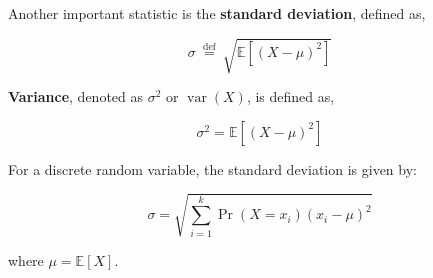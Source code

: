\documentclass[9pt,dvipsnames]{beamer}
\begin{document}
\begin{frame}
	Another important statistic is the \textbf{standard deviation}, defined as,

	$$
		\sigma \stackrel{\text { def }}{=} \sqrt{\mathbb{E}\left[(X-\mu)^{2}\right]}
	$$

	\textbf{Variance}, denoted as $\sigma^{2}$ or $\operatorname{var}(X)$, is defined as,

	$$
		\sigma^{2}=\mathbb{E}\left[(X-\mu)^{2}\right]
	$$

	For a discrete random variable, the standard deviation is given by:

	\[
		\sigma = \sqrt{\sum_{i=1}^{k} \operatorname{Pr}(X=x_i) (x_i - \mu)^2}
	\]


	where $\mu=\mathbb{E}[X]$.
\end{frame}
\end{document}
